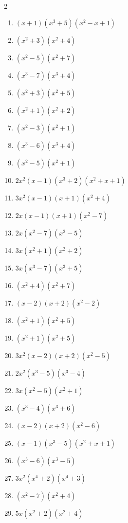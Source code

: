 \documentclass[11pt,oneside]{book}
\begin{document}
\begin{multicols}{2}
\begin{enumerate}[leftmargin=*,label=\textbf{H\arabic*.},itemsep=0.45\baselineskip]
\item $ \left(x + 1\right) \left(x^{3} + 5\right) \left(x^{2} - x + 1\right) $
\item $ \left(x^{2} + 3\right) \left(x^{2} + 4\right) $
\item $ \left(x^{2} - 5\right) \left(x^{2} + 7\right) $
\item $ \left(x^{3} - 7\right) \left(x^{3} + 4\right) $
\item $ \left(x^{2} + 3\right) \left(x^{2} + 5\right) $
\item $ \left(x^{2} + 1\right) \left(x^{2} + 2\right) $
\item $ \left(x^{2} - 3\right) \left(x^{2} + 1\right) $
\item $ \left(x^{3} - 6\right) \left(x^{3} + 4\right) $
\item $ \left(x^{2} - 5\right) \left(x^{2} + 1\right) $
\item $ 2 x^{2} \left(x - 1\right) \left(x^{3} + 2\right) \left(x^{2} + x + 1\right) $
\item $ 3 x^{2} \left(x - 1\right) \left(x + 1\right) \left(x^{2} + 4\right) $
\item $ 2 x \left(x - 1\right) \left(x + 1\right) \left(x^{2} - 7\right) $
\item $ 2 x \left(x^{2} - 7\right) \left(x^{2} - 5\right) $
\item $ 3 x \left(x^{2} + 1\right) \left(x^{2} + 2\right) $
\item $ 3 x \left(x^{3} - 7\right) \left(x^{3} + 5\right) $
\item $ \left(x^{2} + 4\right) \left(x^{2} + 7\right) $
\item $ \left(x - 2\right) \left(x + 2\right) \left(x^{2} - 2\right) $
\item $ \left(x^{2} + 1\right) \left(x^{2} + 5\right) $
\item $ \left(x^{2} + 1\right) \left(x^{2} + 5\right) $
\item $ 3 x^{2} \left(x - 2\right) \left(x + 2\right) \left(x^{2} - 5\right) $
\item $ 2 x^{2} \left(x^{3} - 5\right) \left(x^{3} - 4\right) $
\item $ 3 x \left(x^{2} - 5\right) \left(x^{2} + 1\right) $
\item $ \left(x^{3} - 4\right) \left(x^{3} + 6\right) $
\item $ \left(x - 2\right) \left(x + 2\right) \left(x^{2} - 6\right) $
\item $ \left(x - 1\right) \left(x^{3} - 5\right) \left(x^{2} + x + 1\right) $
\item $ \left(x^{3} - 6\right) \left(x^{3} - 5\right) $
\item $ 3 x^{2} \left(x^{4} + 2\right) \left(x^{4} + 3\right) $
\item $ \left(x^{2} - 7\right) \left(x^{2} + 4\right) $
\item $ 5 x \left(x^{2} + 2\right) \left(x^{2} + 4\right) $
\end{enumerate}
\end{multicols}
\end{document}

